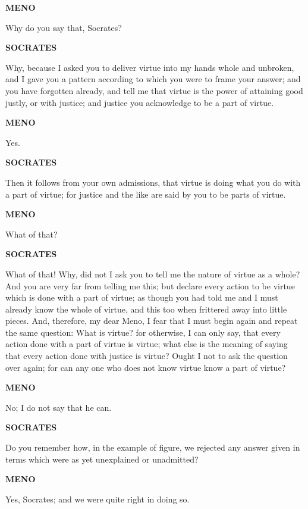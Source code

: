 \documentclass[11pt,letter]{article}
\begin{document}
\par \textbf{MENO}
\par   Why do you say that, Socrates?

\par \textbf{SOCRATES}
\par   Why, because I asked you to deliver virtue into my hands whole and unbroken, and I gave you a pattern according to which you were to frame your answer; and you have forgotten already, and tell me that virtue is the power of attaining good justly, or with justice; and justice you acknowledge to be a part of virtue.

\par \textbf{MENO}
\par   Yes.

\par \textbf{SOCRATES}
\par   Then it follows from your own admissions, that virtue is doing what you do with a part of virtue; for justice and the like are said by you to be parts of virtue.

\par \textbf{MENO}
\par   What of that?

\par \textbf{SOCRATES}
\par   What of that! Why, did not I ask you to tell me the nature of virtue as a whole? And you are very far from telling me this; but declare every action to be virtue which is done with a part of virtue; as though you had told me and I must already know the whole of virtue, and this too when frittered away into little pieces. And, therefore, my dear Meno, I fear that I must begin again and repeat the same question:  What is virtue? for otherwise, I can only say, that every action done with a part of virtue is virtue; what else is the meaning of saying that every action done with justice is virtue? Ought I not to ask the question over again; for can any one who does not know virtue know a part of virtue?

\par \textbf{MENO}
\par   No; I do not say that he can.

\par \textbf{SOCRATES}
\par   Do you remember how, in the example of figure, we rejected any answer given in terms which were as yet unexplained or unadmitted?

\par \textbf{MENO}
\par   Yes, Socrates; and we were quite right in doing so.
\end{document}
